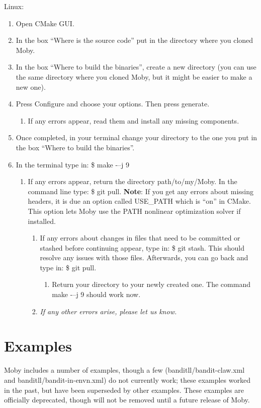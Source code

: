 \documentclass[11pt, letterpaper]{article}
\begin{document}
Linux: 
\begin{enumerate}
\item Open CMake GUI.
\item In the box ``Where is the source code'' put in the directory where you cloned Moby.
\item In the box ``Where to build the binaries'', create a new directory (you can use the same directory where you cloned Moby, but it might be easier to make a new one).
\item Press Configure and choose your options. Then press generate.
\begin{enumerate}
\item If any errors appear, read them and install any missing components.
\end{enumerate}
\item Once completed, in your terminal change your directory to the one you put in the box ``Where to build the binaries''.
\item In the terminal type in: \$ make -–j 9
\begin{enumerate}
\item If any errors appear, return the directory path/to/my/Moby.  In the command line type: \$ git pull.  {\bfseries Note}: If you get any errors about missing headers, it is due an option called USE\_PATH which is ``on'' in CMake.  This option lets Moby use the PATH nonlinear optimization solver if installed.
\begin{enumerate}
\item If any errors about changes in files that need to be committed or stashed before continuing appear, type in: \$ git stash.  This should resolve any issues with those files.  Afterwards, you can go back and type in: \$ git pull.
\begin{enumerate}
\item Return your directory to your newly created one. The command make -–j 9 should work now.
\end{enumerate}
\item {\em If any other errors arise, please let us know.}
\end{enumerate}
\end{enumerate}
\end{enumerate}

\section{Examples}
Moby includes a number of examples, though a few (banditll/bandit-claw.xml and banditll/bandit-in-envn.xml) do not currently work; these examples worked in the past, but have been superseded by other examples. These examples are officially deprecated, though will not be removed until a future release of Moby.
\end{document}
